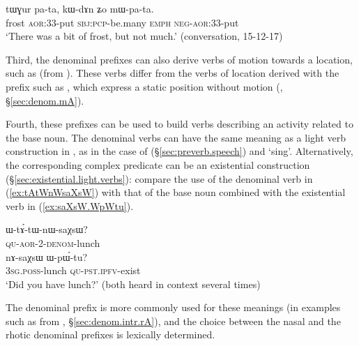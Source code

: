  \begin{exe}
\ex \label{ex:tWGur.pata}
 \gll tɯɣur pa-ta, kɯ-dɤn ʑo mɯ-pa-ta. \\
 frost \textsc{aor}:3\fl{}3-put \textsc{sbj}:\textsc{pcp}-be.many \textsc{emph} \textsc{neg}-\textsc{aor}:3\fl{}3-put \\
 \glt `There was a bit of frost, but not much.' (conversation, 15-12-17)
 \end{exe}
 
 
 Third,  the  denominal prefixes can also derive verbs of motion towards a location, such as  (from  ). These verbs differ from the verbs of location derived with the  prefix such as , which express a static position without motion (, §\ref{sec:denom.mA}).
 
  
Fourth, these prefixes can be used to build verbs describing an activity related to the base noun. The denominal verbs can have the same meaning as a light verb construction in , as in the case of   (§\ref{sec:preverb.speech}) and  `sing'. Alternatively, the corresponding complex predicate can be an existential construction (§\ref{sec:existential.light.verbs}): compare the use of the denominal verb    in (\ref{ex:tAtWnWsaXsW}) with that of the base noun  combined with the existential verb  in (\ref{ex:saXsW.WpWtu}).

 \begin{exe}
 \ex 
 \begin{xlist}
\ex \label{ex:tAtWnWsaXsW}
 \gll ɯ-tɤ́-tɯ-nɯ-saχsɯ? \\
 \textsc{qu}-\textsc{aor}-2-\textsc{denom}-lunch \\
 \ex \label{ex:saXsW.WpWtu}
  \gll nɤ-saχsɯ ɯ-pɯ́-tu? \\
\textsc{3sg}.\textsc{poss}-lunch \textsc{qu}-\textsc{pst}.\textsc{ipfv}-exist \\
\glt `Did you have lunch?' (both heard in context several times)
\end{xlist}
\end{exe}

The  denominal prefix is more commonly used for these meanings (in examples such as  from , §\ref{sec:denom.intr.rA}), and the choice between the nasal and the rhotic denominal prefixes is lexically determined.
 
